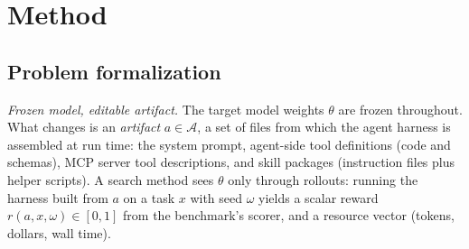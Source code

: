 \providecommand{\TODO}[1]{\textbf{[TODO: #1]}}
\newcommand{\artifact}{a}
\newcommand{\Dopt}{\mathcal{D}_{\mathrm{opt}}}
\newcommand{\Dsel}{\mathcal{D}_{\mathrm{sel}}}
\newcommand{\Dfin}{\mathcal{D}_{\mathrm{fin}}}
\newcommand{\rbar}{\bar r}
\newcommand{\SE}{\mathrm{SE}}

\section{Method}
\label{sec:method}

\subsection{Problem formalization}
\label{sec:method:problem}

\emph{Frozen model, editable artifact.}
The target model weights $\theta$ are frozen throughout. What changes is an \emph{artifact} $\artifact\in\mathcal{A}$, a
set of files from which the agent harness is assembled at run time: the system prompt, agent-side tool definitions
(code and schemas), MCP server tool descriptions, and skill packages (instruction files plus helper scripts).
A search method sees $\theta$ only through rollouts: running the harness built from $\artifact$ on a task $x$ with
seed $\omega$ yields a scalar reward $r(\artifact,x,\omega)\in[0,1]$ from the benchmark's scorer, and a resource
vector (tokens, dollars, wall time).

